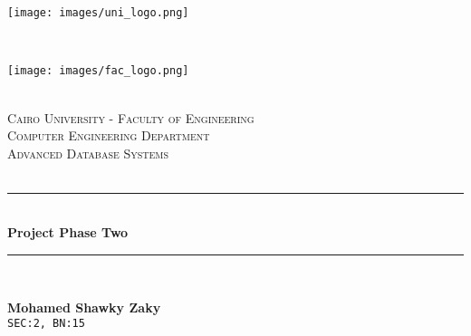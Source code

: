 \documentclass[a4paper,12pt]{article}
\begin{document}
\begin{titlepage}
\newcommand{\HRule}{\rule{\linewidth}{0.5mm}} %
\setlength{\topmargin}{0in}
\center %
 
 \begin{minipage}{0.4\textwidth}
\begin{flushleft} \large
\hspace*{-0.5cm}
\texttt{[image: images/uni\_logo.png]}\\
\end{flushleft}
\end{minipage}
~
\begin{minipage}{0.5\textwidth}
\begin{flushright} \large
\hspace*{2cm}
\texttt{[image: images/fac\_logo.png]}\\
\end{flushright}
\end{minipage}\\[1cm]

\textsc{\Large Cairo University - Faculty of Engineering}\\[0.5cm] %
\textsc{Computer Engineering Department} \\[0.5cm] 
\textsc{Advanced Database Systems} \\[0.5cm] 
\textsc{\large }\\[0.5cm] %


\HRule \\[0.4cm]
{ \huge \bfseries Project Phase Two}\\[0.4cm] %
\HRule \\[1cm]
 
\begin{minipage}{0.8\textwidth}
\begin{flushleft} 
\textbf{Mohamed Shawky Zaky} \\
\texttt{SEC:2, BN:15} \\[0.5cm]


\end{flushleft}
\end{minipage}
\end{titlepage}
\end{document}
